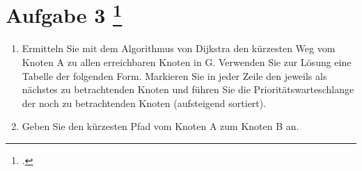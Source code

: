 \documentclass{lehramt-informatik-aufgabe}
\begin{document}
\section{Aufgabe 3
\footcite{examen:66115:2020:09}}

\begin{enumerate}


\item Ermitteln Sie mit dem Algorithmus von Dijkstra den kürzesten Weg
vom Knoten A zu allen erreichbaren Knoten in G. Verwenden Sie zur Lösung
eine Tabelle der folgenden Form. Markieren Sie in jeder Zeile den
jeweils als nächstes zu betrachtenden Knoten und führen Sie die
Prioritätswarteschlange der noch zu betrachtenden Knoten (aufsteigend
sortiert).


\item Geben Sie den kürzesten Pfad vom Knoten A zum Knoten B an.
\end{enumerate}
\end{document}
